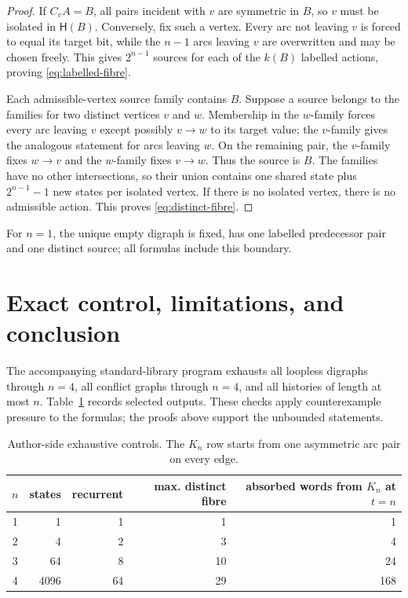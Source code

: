 \documentclass[a4paper,10pt]{amsart}
\theoremstyle{remark}
\newcommand{\Conf}{\mathsf H}
\begin{document}
\begin{proof}
If $C_vA=B$, all pairs incident with $v$ are symmetric in $B$, so $v$ must
be isolated in $\Conf(B)$.  Conversely, fix such a vertex.  Every arc not
leaving $v$ is forced to equal its target bit, while the $n-1$ arcs leaving
$v$ are overwritten and may be chosen freely.  This gives $2^{n-1}$ sources
for each of the $k(B)$ labelled actions, proving
\eqref{eq:labelled-fibre}.

Each admissible-vertex source family contains $B$.  Suppose a source belongs
to the families for two distinct vertices $v$ and $w$.  Membership in the
$w$-family forces every arc leaving $v$ except possibly $v\to w$ to its
target value; the $v$-family gives the analogous statement for arcs leaving
$w$.  On the remaining pair, the $v$-family fixes $w\to v$ and the
$w$-family fixes $v\to w$.  Thus the source is $B$.  The families have no
other intersections, so their union contains one shared state plus
$2^{n-1}-1$ new states per isolated vertex.  If there is no isolated vertex,
there is no admissible action.  This proves \eqref{eq:distinct-fibre}.
\end{proof}

For $n=1$, the unique empty digraph is fixed, has one labelled predecessor
pair and one distinct source; all formulas include this boundary.

\section{Exact control, limitations, and conclusion}

The accompanying standard-library program exhausts all loopless digraphs
through $n=4$, all conflict graphs through $n=4$, and all histories of length
at most $n$.  Table~\ref{tab:control} records selected outputs.  These checks
apply counterexample pressure to the formulas; the proofs above support the
unbounded statements.

\begin{table}[h]
\centering
\small
\begin{tabular}{crrrr}
\hline
$n$ & states & recurrent & max. distinct fibre & absorbed words from $K_n$ at $t=n$\\
\hline
1&1&1&1&1\\
2&4&2&3&4\\
3&64&8&10&24\\
4&4096&64&29&168\\
\hline
\end{tabular}
\caption{Author-side exhaustive controls.  The $K_n$ row starts from one
asymmetric arc pair on every edge.}
\label{tab:control}
\end{table}
\end{document}
